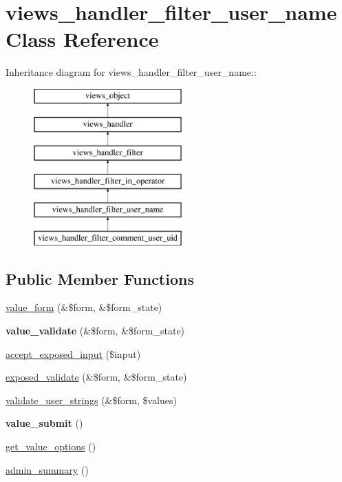 \hypertarget{classviews__handler__filter__user__name}{
\section{views\_\-handler\_\-filter\_\-user\_\-name Class Reference}
\label{classviews__handler__filter__user__name}
}
Inheritance diagram for views\_\-handler\_\-filter\_\-user\_\-name::\begin{figure}[H]
\begin{center}
\leavevmode
\includegraphics[height=6cm]{classviews__handler__filter__user__name}
\end{center}
\end{figure}
\subsection*{Public Member Functions}
\begin{CompactItemize}
\item 
\hyperlink{classviews__handler__filter__user__name_08bc953c1682728eb0d38e5592a3286e}{value\_\-form} (\&\$form, \&\$form\_\-state)
\item 
\hypertarget{classviews__handler__filter__user__name_8c2297a8874a9f223c4e5ab81131f58d}{
\textbf{value\_\-validate} (\&\$form, \&\$form\_\-state)}
\label{classviews__handler__filter__user__name_8c2297a8874a9f223c4e5ab81131f58d}

\item 
\hyperlink{classviews__handler__filter__user__name_a6ae18031b13da1c92d83b8c5de74c15}{accept\_\-exposed\_\-input} (\$input)
\item 
\hyperlink{classviews__handler__filter__user__name_3510a0e9b2c5fea7460a42049e0a58c0}{exposed\_\-validate} (\&\$form, \&\$form\_\-state)
\item 
\hyperlink{classviews__handler__filter__user__name_8c3d5b4e3a63b0e39fcf36a2ab5ef43d}{validate\_\-user\_\-strings} (\&\$form, \$values)
\item 
\hypertarget{classviews__handler__filter__user__name_e29ec3659ded155bdc1278dd5ebe7bc0}{
\textbf{value\_\-submit} ()}
\label{classviews__handler__filter__user__name_e29ec3659ded155bdc1278dd5ebe7bc0}

\item 
\hyperlink{classviews__handler__filter__user__name_039044fb84e609938564ae6c8a40580c}{get\_\-value\_\-options} ()
\item 
\hyperlink{classviews__handler__filter__user__name_ba7659d0d6c937d9c346e8ed3af532b6}{admin\_\-summary} ()
\end{CompactItemize}

